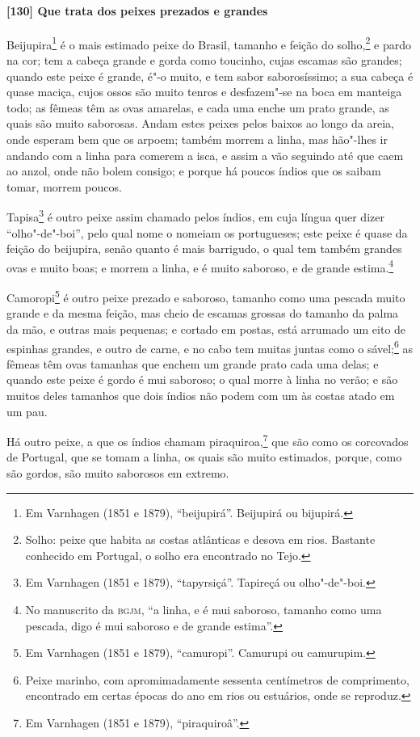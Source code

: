 \paragraph{[130] Que trata dos peixes prezados e grandes}\quad
Beijupira\footnote{ Em Varnhagen (1851 e 1879), ``beijupirá''. Beijupirá ou bijupirá.} é o
mais estimado peixe do Brasil, tamanho e feição do solho,\footnote{ Solho: peixe que habita
as costas atlânticas e desova em rios. Bastante conhecido em Portugal, o solho era
encontrado no Tejo.} e pardo na cor; tem a cabeça grande e gorda como toucinho, cujas
escamas são grandes; quando este peixe é grande, é"-o muito, e tem sabor saborosíssimo; a
sua cabeça é quase maciça, cujos ossos são muito tenros e desfazem"-se na boca em manteiga
todo; as fêmeas têm as ovas amarelas, e cada uma enche um prato grande, as quais são muito
saborosas. Andam estes peixes pelos baixos ao longo da areia, onde esperam bem que os
arpoem; também morrem a linha, mas hão"-lhes ir andando com a linha para comerem a isca, e
assim a vão seguindo até que caem ao anzol, onde não bolem consigo; e porque há poucos
índios que os saibam tomar, morrem poucos.

Tapisa\footnote{ Em Varnhagen (1851 e 1879), ``tapyrsiçá''. Tapireçá ou olho"-de"-boi.} é
outro peixe assim chamado pelos índios, em cuja língua quer dizer ``olho"-de"-boi'', pelo
qual nome o nomeiam os portugueses; este peixe é quase da feição do beijupira, senão
quanto é mais barrigudo, o qual tem também grandes ovas e muito boas; e morrem a linha, e
é muito saboroso, e de grande estima.\footnote{ No manuscrito da \textsc{bgjm}, ``a linha,
e é mui saboroso, tamanho como uma pescada, digo é mui saboroso e de grande estima''.}

Camoropi\footnote{ Em Varnhagen (1851 e 1879), ``camuropi''. Camurupi ou camurupim.} é
outro peixe prezado e saboroso, tamanho como uma pescada muito grande e da mesma feição,
mas cheio de escamas grossas do tamanho da palma da mão, e outras mais pequenas; e cortado
em postas, está arrumado um eito de espinhas grandes, e outro de carne, e no cabo tem
muitas juntas como o sável;\footnote{ Peixe marinho, com apromimadamente sessenta centímetros de
comprimento, encontrado em certas épocas do ano em rios ou estuários, onde se reproduz.}
as fêmeas têm ovas tamanhas que enchem um grande prato cada uma delas; e quando este peixe
é gordo é mui saboroso; o qual morre à linha no verão; e são muitos deles tamanhos que
dois índios não podem com um às costas atado em um pau.

Há outro peixe, a que os índios chamam piraquiroa,\footnote{ Em Varnhagen (1851 e 1879),
``piraquiroâ''.} que são como os corcovados de Portugal, que se tomam a linha, os quais
são muito estimados, porque, como são gordos, são muito saborosos em extremo.

